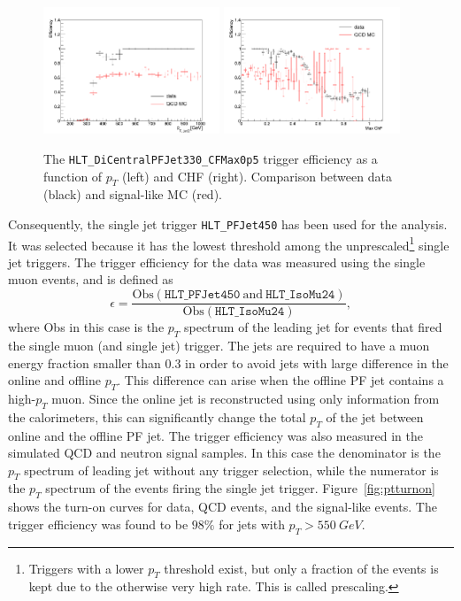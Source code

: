 \begin{figure}[ht]
  \centering
  \includegraphics[width=0.47\textwidth]{figures/trigger/pt_eff_05_DataSIMP.png}\hfill%
  \includegraphics[width=0.47\textwidth]{figures/trigger/chf_eff_05_DataSIMP.png}
  \caption{The \texttt{HLT\_DiCentralPFJet330\_CFMax0p5} trigger efficiency as a function of $p_{T}$ (left) and CHF (right). Comparison between data (black) and signal-like MC (red).}
  \label{fig:efficiencies_simp_data}
\end{figure}

Consequently, the single jet trigger \texttt{HLT\_PFJet450} has been used for the analysis. It was selected because it has the lowest threshold among the unprescaled\footnote{Triggers with a lower $p_T$ threshold exist, but only a fraction of the events is kept due to the otherwise very high rate. This is called prescaling.} single jet triggers. The trigger efficiency for the data was measured using the single muon events, and is defined as
\begin{equation}
\epsilon = \frac{\mathrm{Obs}(\texttt{HLT\_PFJet450}\ \mathrm{and}\ \texttt{HLT\_IsoMu24})}{\mathrm{Obs}(\texttt{HLT\_IsoMu24})},
\end{equation} 
where Obs in this case is the $p_T$ spectrum of the leading jet for events that fired the single muon (and single jet) trigger. The jets are required to have a muon energy fraction smaller than $0.3$ in order to avoid jets with large difference in the online and offline $p_T$. This difference can arise when the offline \ac{PF} jet contains a high-$p_T$ muon. Since the online jet is reconstructed using only information from the calorimeters, this can significantly change the total $p_T$ of the jet between online and the offline \ac{PF} jet. The trigger efficiency was also measured in the simulated \acs{QCD} and neutron signal samples. In this case the denominator is the $p_T$ spectrum of leading jet without any trigger selection, while the numerator is the $p_T$ spectrum of the events firing the single jet trigger. Figure~\ref{fig:ptturnon} shows the turn-on curves for data, \acs{QCD} events, and the signal-like events. The trigger efficiency was found to be $98\%$ for jets with $p_{T}>\SI{550}{GeV}$.

